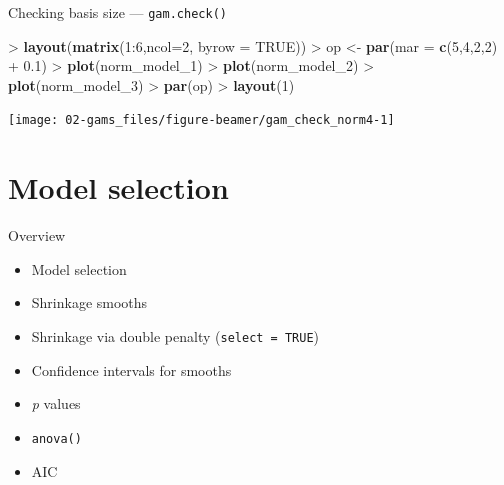 \documentclass[10pt,ignorenonframetext,compress, aspectratio=169]{beamer}
\newenvironment{Shaded}{\begin{snugshade}}{\end{snugshade}}
\newcommand{\KeywordTok}[1]{\textcolor[rgb]{0.13,0.29,0.53}{\textbf{{#1}}}}
\newcommand{\DataTypeTok}[1]{\textcolor[rgb]{0.13,0.29,0.53}{{#1}}}
\newcommand{\DecValTok}[1]{\textcolor[rgb]{0.00,0.00,0.81}{{#1}}}
\newcommand{\FloatTok}[1]{\textcolor[rgb]{0.00,0.00,0.81}{{#1}}}
\newcommand{\StringTok}[1]{\textcolor[rgb]{0.31,0.60,0.02}{{#1}}}
\newcommand{\OtherTok}[1]{\textcolor[rgb]{0.56,0.35,0.01}{{#1}}}
\newcommand{\NormalTok}[1]{{#1}}
\providecommand{\tightlist}{%
  \setlength{\itemsep}{0pt}\setlength{\parskip}{0pt}}
\begin{document}
\begin{frame}[fragile]{Checking basis size --- \texttt{gam.check()}}

\begin{Shaded}
\begin{Highlighting}[]
\NormalTok{>}\StringTok{ }\KeywordTok{layout}\NormalTok{(}\KeywordTok{matrix}\NormalTok{(}\DecValTok{1}\NormalTok{:}\DecValTok{6}\NormalTok{,}\DataTypeTok{ncol=}\DecValTok{2}\NormalTok{, }\DataTypeTok{byrow =} \OtherTok{TRUE}\NormalTok{))}
\NormalTok{>}\StringTok{ }\NormalTok{op <-}\StringTok{ }\KeywordTok{par}\NormalTok{(}\DataTypeTok{mar =} \KeywordTok{c}\NormalTok{(}\DecValTok{5}\NormalTok{,}\DecValTok{4}\NormalTok{,}\DecValTok{2}\NormalTok{,}\DecValTok{2}\NormalTok{) +}\StringTok{ }\FloatTok{0.1}\NormalTok{)}
\NormalTok{>}\StringTok{ }\KeywordTok{plot}\NormalTok{(norm_model_1)}
\NormalTok{>}\StringTok{ }\KeywordTok{plot}\NormalTok{(norm_model_2)}
\NormalTok{>}\StringTok{ }\KeywordTok{plot}\NormalTok{(norm_model_3)}
\NormalTok{>}\StringTok{ }\KeywordTok{par}\NormalTok{(op)}
\NormalTok{>}\StringTok{ }\KeywordTok{layout}\NormalTok{(}\DecValTok{1}\NormalTok{)}
\end{Highlighting}
\end{Shaded}

\begin{center}\texttt{[image: 02-gams\_files/figure-beamer/gam\_check\_norm4-1]} \end{center}

\end{frame}

\section{Model selection}\label{model-selection}

\begin{frame}[fragile]{Overview}

\begin{itemize}
\tightlist
\item
  Model selection
\item
  Shrinkage smooths
\item
  Shrinkage via double penalty (\texttt{select\ =\ TRUE})
\item
  Confidence intervals for smooths
\item
  \emph{p} values
\item
  \texttt{anova()}
\item
  AIC
\end{itemize}

\end{frame}
\end{document}
